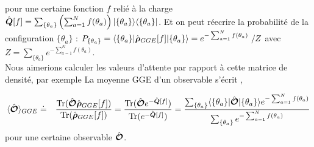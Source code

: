 	
	pour une certaine fonction $f$ relié à la charge $\hat{\bm{Q}} [f]  = \sum_{\{\theta_a \}} \left ( \sum_{a = 1}^N f ( \theta_a )  \right ) \vert \{ \theta_a \} \rangle \langle \{ \theta_a \} \vert $.
	Et on peut réecrire la probabilité de la configuration $\{\theta_a\}$ : $ P_{\{ \theta_a \}} = \langle \{ \theta_a \}\vert \operator{\rho}_{GGE}[f] \vert  \{ \theta_a \} \rangle = e^{-\sum_{a = 1}^N f(\theta_a)} / Z $ avec $Z = \sum_{\{\theta_a \}} e^{-\sum_{a = 1}^N f(\theta_a)}$.\\
	
	 Nous aimerions calculer les valeurs d'attente par rapport à cette matrice de densité, par exemple
	La moyenne GGE d'un observable s'écrit ,
	\begin{aff}
	\begin{eqnarray}
		\langle \hat{\bm{\mathcal{O}}} \rangle_{GGE} & \doteq & \displaystyle  \frac{\text{Tr} (\hat{\bm{\mathcal{O}}}\hat{\bm{\rho}}_{GGE}[f])}{\text{Tr} (\hat{\bm{\rho}}_{GGE}[f])} = \frac{\text{Tr} (\hat{\bm{\mathcal{O}}}e^{-\hat{\bm{Q}}[f]})}{\text{Tr} (e^{-\hat{\bm{Q}}[f]})}	 = \frac{\sum_{\{\theta_a \}} \langle  \{ \theta_a\}  \vert   \hat{\bm{\mathcal{O}}} \vert \{ \theta_a\} \rangle e^{- \sum_{a = 1}^N f(\theta_a) }  }{\sum_{\{\theta_a  \}} e^{- \sum_{a = 1}^N  f(\theta_a) } }
	\end{eqnarray}
	pour une certaine observable $\hat{\bm{\mathcal{O}}}$.\\
	\end{aff}
